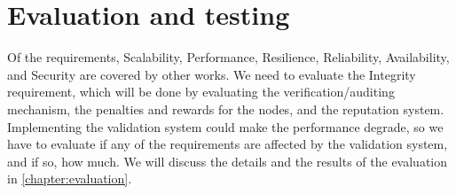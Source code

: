 \label{section:evaluation}
\section{Evaluation and testing}

Of the requirements, Scalability, Performance, Resilience, Reliability, Availability, and Security
are covered by other works.
We need to evaluate the Integrity requirement, which will be done by evaluating the verification/auditing mechanism,
the penalties and rewards for the nodes, and the reputation system.
Implementing the validation system could make the performance degrade, so we have to evaluate
if any of the requirements are affected by the validation system, and if so, how much.
We will discuss the details and the results of the evaluation in \ref{chapter:evaluation}.
